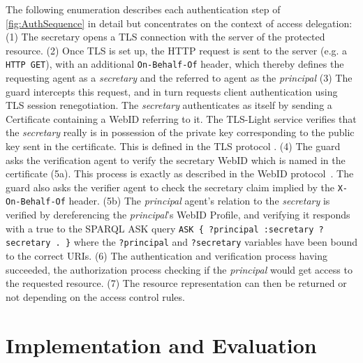 \documentclass[a4paper]{llncs}
\begin{document}
The following enumeration describes each authentication step of \autoref{fig:AuthSequence} in detail but concentrates on the context of access delegation:
(1) The secretary  opens a TLS connection with the server of the protected resource.
(2) Once TLS is set up, the HTTP request is sent to the server (e.g. a \verb!HTTP GET!), with an additional \lstinline|On-Behalf-Of| header, which thereby defines the requesting agent as a \textit{secretary} and the referred to agent as the \textit{principal} 
(3) The guard intercepts this request, and  in turn requests client authentication using TLS session renegotiation.
The \textit{secretary} authenticates as itself by sending a Certificate containing a WebID referring to it.
The TLS-Light service verifies that the \textit{secretary} really is in possession of the private key corresponding to the public key sent in the certificate.
This is defined in the TLS protocol \cite{dierks-t-2012--a}.
(4) The guard asks the verification agent to verify the secretary WebID which is named in the certificate (5a).
This process is exactly as described in the WebID protocol~\cite{story-h-2009--a}.
The guard also asks the verifier agent to check the secretary claim implied by the \lstinline|X-On-Behalf-Of| header.
(5b) The \textit{principal} agent's relation to the \textit{secretary} is  verified by dereferencing the \textit{principal}'s WebID Profile, and verifying it responds with a true to the SPARQL ASK query \lstinline|ASK { ?principal :secretary ?secretary . }| where the \lstinline|?principal| and \lstinline|?secretary| variables have been bound to the correct URIs.
(6) The authentication and verification process having succeeded, the authorization process checking if the \textit{principal} would get access to the requested resource.
(7) The resource representation can then be returned or not depending on the access control rules.


\section{Implementation and Evaluation}\label{sec:eval}
\end{document}
